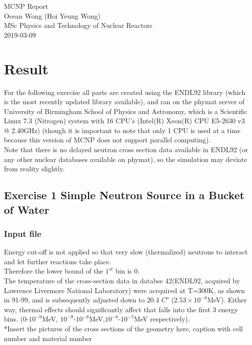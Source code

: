 \documentclass[a4paper, 12pt]{article}
\begin{document}
\begin{center}
MCNP Report										\\
Ocean Wong (Hoi Yeung Wong)						\\
MSc Physics and Technology of Nuclear Reactors	\\
2019-03-09 										\\
\end{center}
\section{Result}
For the following exercise all parts are created using the ENDL92 library (which is the most recently updated library available), and ran on the phymat server of University of Birmingham School of Physics and Astronomy, which is a Scientific Linux 7.3 (Nitrogen) system with 16 CPU's (Intel(R) Xeon(R) CPU E5-2630 v3 @ 2.40GHz) (though it is important to note that only 1 CPU is used at a time because this version of MCNP does not support parallel computing). 
\\Note that there is no delayed neutron cross section data available in ENDL92 (or any other nuclear databases available on phymat), so the simulation may deviate from reality slightly.
\subsection{Exercise 1 Simple Neutron Source in a Bucket of Water}
\subsubsection{Input file}
Energy cut-off is not applied so that very slow (thermalized) neutrons to interact and let further reactions take place.
\\Therefore the lower bound of the $1^{st}$ bin is 0.
\\The temperature of the cross-section data in databse 42(ENDL92, acquired by Lawrence Livermore National Laboratory) were acrquired at T=300K, as shown in 91-99, and is subsequently adjusted down to 20.4 $C^{o}$ ($2.53 \times 10^{-8}$MeV). Either way, thermal effects should significantly affect that falls into the first 3 energy bins. ($0$-$10^{-9}$MeV, $10^{-9}$-$10^{-8}$MeV,$10^{-8}$-$10^{-7}$MeV respectively).
\\*Insert the pictures of the cross sections of the geometry here, caption with cell number and material number\\
\end{document}
